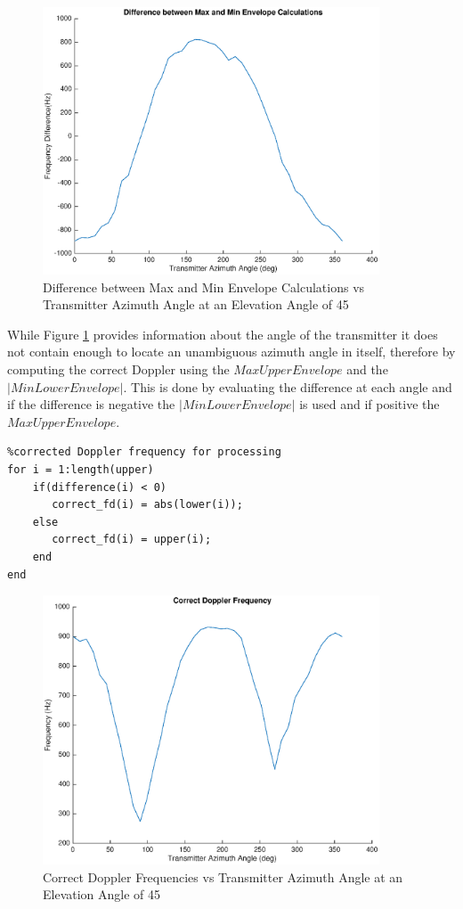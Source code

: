  \begin{figure}[b]
	\begin{center}
		\includegraphics[width=10cm]{images/results/Azimuth_angle_estimation_difference.eps}
		\caption{Difference between Max and Min Envelope Calculations vs Transmitter Azimuth Angle at an Elevation Angle of 45\textdegree}
		\label{fig:azimuth_estimation_difference}
	\end{center}
\end{figure}

While Figure \ref{fig:azimuth_estimation_difference} provides information about the angle of the transmitter it does not contain enough to locate an unambiguous azimuth angle in itself, therefore by computing the correct Doppler using the $Max Upper Envelope$ and the $| Min Lower Envelope |$. This is done by evaluating the difference at each angle and if the difference is negative the $| Min Lower Envelope |$ is used and if positive the $Max Upper Envelope$.

\begin{lstlisting}
%corrected Doppler frequency for processing
for i = 1:length(upper)
    if(difference(i) < 0)
       correct_fd(i) = abs(lower(i));
    else
       correct_fd(i) = upper(i);
    end
end
\end{lstlisting}

\begin{figure}
	\begin{center}
		\includegraphics[width=10cm]{images/results/Correct_doppler.eps}
		\caption{Correct Doppler Frequencies vs Transmitter Azimuth Angle at an Elevation Angle of 45\textdegree}
		\label{fig:correct_fd}
	\end{center}
\end{figure}

